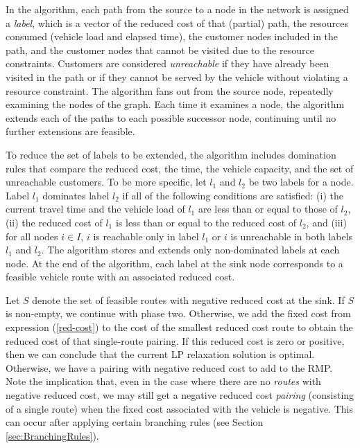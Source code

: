 \documentclass[11pt]{article}
\begin{document}
In the \citet{Feillet} algorithm, each path from the source to a node in the network is assigned a 
{\em label}, which is a vector of the reduced cost of that (partial) path, the resources consumed (vehicle 
load and elapsed time),
the customer nodes included in the path, and the customer nodes that cannot  
be visited due to the resource constraints.  Customers are considered {\em unreachable} if
they have already been visited in the path or if they cannot be served by the vehicle without
violating a resource constraint. The algorithm fans out from the source node,
repeatedly examining the nodes of the graph.  Each time it examines a node, the algorithm 
extends each of the paths to each possible successor node, continuing until no further extensions are feasible.  

To reduce the set of labels to be extended, the algorithm
includes domination rules that compare the reduced cost, the time, the vehicle capacity, 
and the set of unreachable customers.  
To be more specific, let $l_1$ and $l_2$ be two labels for a node.  Label $l_1$ dominates label $l_2$
if all of the following conditions are satisfied: (i) the current travel time and the vehicle load 
of $l_1$ are less than or equal to those of $l_2$, 
(ii) the reduced cost of $l_1$ is less than or equal to the reduced cost of $l_2$, and 
(iii) for all nodes $i \in I$, $i$ is reachable only in label $l_1$ or $i$ is 
unreachable in both labels  $l_1$ and  $l_2$.
The algorithm stores and extends only non-dominated labels
at each node.  At the end of the algorithm, each label at the sink node corresponds to 
a feasible vehicle route with an associated reduced cost.  

Let $S$ denote the set of feasible routes with negative reduced cost at the
sink. If $S$ is non-empty, we continue with phase two. Otherwise, we add the
fixed cost from expression (\ref{red-cost}) to the cost of the smallest
reduced cost route to obtain the reduced cost of that single-route pairing.
If this reduced cost is zero or positive, then we
can conclude that the current LP relaxation solution is optimal. Otherwise,
we have a pairing with negative reduced cost to add to the RMP.
Note the implication that, even in the case where there are no
\emph{routes} with negative reduced cost, we may still get a negative reduced
cost \emph{pairing} (consisting of a single route) when the fixed cost
associated with the vehicle is negative. This can occur after applying certain
branching rules (see Section \ref{sec:BranchingRules}).
\end{document}

